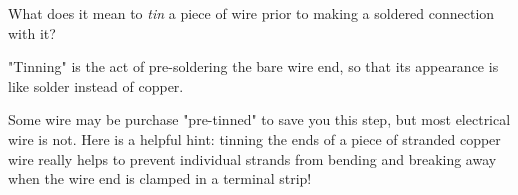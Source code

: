 

What does it mean to {\it tin} a piece of wire prior to making a soldered connection with it?







"Tinning" is the act of pre-soldering the bare wire end, so that its appearance is like solder instead of copper.







Some wire may be purchase "pre-tinned" to save you this step, but most electrical wire is not.  Here is a helpful hint: tinning the ends of a piece of stranded copper wire really helps to prevent individual strands from bending and breaking away when the wire end is clamped in a terminal strip!




